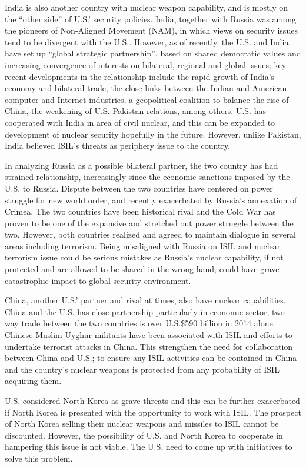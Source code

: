 \documentclass{report}
\begin{document}
India is also another country with nuclear weapon capability, and is mostly on the \enquote{other side} of U.S.' security policies. India, together with Russia was among the pioneers of Non-Aligned Movement (NAM), in which views on security issues tend to be divergent with the U.S.. However, as of recently, the U.S. and India have set up \enquote{global strategic partnership}, based on shared democratic values and increasing convergence of interests on bilateral, regional and global issues; key recent developments in the relationship include the rapid growth of India's economy and bilateral trade, the close links between the Indian and American computer and Internet industries, a geopolitical coalition to balance the rise of China, the weakening of U.S.-Pakistan relations, among others. U.S. has cooperated with India in area of civil nuclear, and this can be expanded to development of nuclear security hopefully in the future. However, unlike Pakistan, India believed ISIL's threats as periphery issue to the country.

In analyzing Russia as a possible bilateral partner, the two country has had strained relationship, increasingly since the economic sanctions imposed by the U.S. to Russia. Dispute between the two countries have centered on power struggle for new world order, and recently exacerbated by Russia's annexation of Crimea. The two countries have been historical rival and the Cold War has proven to be one of the expansive and stretched out power struggle between the two. However, both countries realized and agreed to maintain dialogue in several areas including terrorism. Being misaligned with Russia on ISIL and nuclear terrorism issue could be serious mistakes as Russia's nuclear capability, if not protected and are allowed to be shared in the wrong hand, could have grave catastrophic impact to global security environment.

China, another U.S.' partner and rival at times, also have nuclear capabilities. China and the U.S. has close partnership particularly in economic sector, two-way trade between the two countries is over U.S.\$590 billion in 2014 alone. Chinese Muslim Uyghur militants have been associated with ISIL and efforts to undertake terrorist attacks in China. This strengthen the need for collaboration between China and U.S.; to ensure any ISIL activities can be contained in China and the country's nuclear weapons is protected from any probability of ISIL acquiring them.

U.S. considered North Korea as grave threats and this can be further exacerbated if North Korea is presented with the opportunity to work with ISIL. The prospect of North Korea selling their nuclear weapons and missiles to ISIL cannot be discounted. However, the possibility of U.S. and North Korea to cooperate in hampering this issue is not viable. The U.S. need to come up with initiatives to solve this problem.
\end{document}
